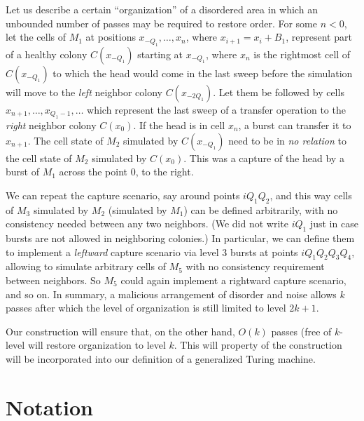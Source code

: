 \documentclass[11pt]{memoir}
\theoremstyle{definition} %
\begin{document}
\begin{example}
  Let us describe a certain ``organization'' of a disordered area in which an unbounded number of passes
  may be required to restore order.
For some \( n<0 \), let the cells of \( M_{1} \) at positions
\( x_{-Q_{1}},\dots,x_{n} \), where \( x_{i+1}=x_{i}+B_{1} \),
represent part of a healthy colony \( C(x_{-Q_{1}}) \) starting at \( x_{-Q_{1}} \), where \( x_{n} \)
is the rightmost cell of \( C(x_{-Q_{1}}) \)
to which the head would come in the last sweep before
the simulation will move to the \emph{left} neighbor colony \( C(x_{-2Q_{1}}) \).
Let them be followed by cells \( x_{n+1},\dots, x_{Q_{1}-1},\dots\)
which represent the last sweep of a transfer operation to the \emph{right} neighbor colony \( C(x_{0}) \).
If the head is in cell \( x_{n} \), a burst can transfer it to \( x_{n+1} \).
The cell state of \( M_{2} \) simulated by \( C(x_{-Q_{1}}) \) need to be in \emph{no relation} to 
the cell state of \( M_{2} \) simulated by \( C(x_{0}) \).
This was a capture of the head by a burst of \( M_{1} \) across the point 0, to the right.

We can repeat the capture scenario, say around points \( i Q_{1}Q_{2} \),
and this way cells of \( M_{3} \) simulated by \( M_{2} \) (simulated by \( M_{1} \))
can be defined arbitrarily, with no consistency needed between any two neighbors.
(We did not write \( i Q_{1} \) just in case bursts are not allowed in neighboring colonies.)
In particular, we can define them to implement a \emph{leftward} capture scenario
via level 3 bursts at points \( i Q_{1}Q_{2}Q_{3}Q_{4} \), allowing to simulate arbitrary cells of \( M_{5} \)
with no consistency requirement between neighbors.
So \( M_{5} \) could again implement a rightward capture scenario, and so on.
In summary, a malicious arrangement of disorder and noise allows \( k \) passes
after which the level of organization is still limited to level \( 2 k + 1 \).
\end{example}

Our construction will ensure that, on the other hand,
\( O(k) \) passes (free of \( k \)-level will restore organization to level \( k \).
This will property of the construction will be incorporated into our definition of a generalized
Turing machine.


\section{Notation}\label{sec:notation}
\end{document}
